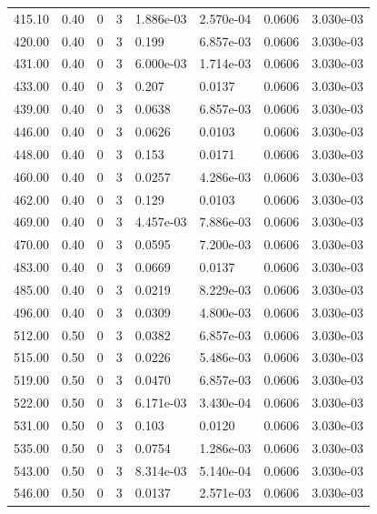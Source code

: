\documentclass[preview]{standalone}
\begin{document}
{{{{\begin{tabular}{L{1.2cm}C{1.2cm} C{0.3cm}C{0.5cm} C{1.4cm}C{1.4cm} C{1.4cm}C{1.4cm}}
  415.10  &  0.40  & 0     &  3 &  1.886e-03  & 2.570e-04  & 0.0606 &  3.030e-03   \\ 
  420.00  &  0.40  & 0     &  3 &  0.199  & 6.857e-03  & 0.0606 &  3.030e-03   \\ 
  431.00  &  0.40  & 0     &  3 &  6.000e-03  & 1.714e-03  & 0.0606 &  3.030e-03   \\ 
  433.00  &  0.40  & 0     &  3 &  0.207  & 0.0137  & 0.0606 &  3.030e-03   \\ 
  439.00  &  0.40  & 0     &  3 &  0.0638  & 6.857e-03  & 0.0606 &  3.030e-03   \\ 
  446.00  &  0.40  & 0     &  3 &  0.0626  & 0.0103  & 0.0606 &  3.030e-03   \\ 
  448.00  &  0.40  & 0     &  3 &  0.153  & 0.0171  & 0.0606 &  3.030e-03   \\ 
  460.00  &  0.40  & 0     &  3 &  0.0257  & 4.286e-03  & 0.0606 &  3.030e-03   \\ 
  462.00  &  0.40  & 0     &  3 &  0.129  & 0.0103  & 0.0606 &  3.030e-03   \\ 
  469.00  &  0.40  & 0     &  3 &  4.457e-03  & 7.886e-03  & 0.0606 &  3.030e-03   \\ 
  470.00  &  0.40  & 0     &  3 &  0.0595  & 7.200e-03  & 0.0606 &  3.030e-03   \\ 
  483.00  &  0.40  & 0     &  3 &  0.0669  & 0.0137  & 0.0606 &  3.030e-03   \\ 
  485.00  &  0.40  & 0     &  3 &  0.0219  & 8.229e-03  & 0.0606 &  3.030e-03   \\ 
  496.00  &  0.40  & 0     &  3 &  0.0309  & 4.800e-03  & 0.0606 &  3.030e-03   \\ 
  512.00  &  0.50  & 0     &  3 &  0.0382  & 6.857e-03  & 0.0606 &  3.030e-03   \\ 
  515.00  &  0.50  & 0     &  3 &  0.0226  & 5.486e-03  & 0.0606 &  3.030e-03   \\ 
  519.00  &  0.50  & 0     &  3 &  0.0470  & 6.857e-03  & 0.0606 &  3.030e-03   \\ 
  522.00  &  0.50  & 0     &  3 &  6.171e-03  & 3.430e-04  & 0.0606 &  3.030e-03   \\ 
  531.00  &  0.50  & 0     &  3 &  0.103  & 0.0120  & 0.0606 &  3.030e-03   \\ 
  535.00  &  0.50  & 0     &  3 &  0.0754  & 1.286e-03  & 0.0606 &  3.030e-03   \\ 
  543.00  &  0.50  & 0     &  3 &  8.314e-03  & 5.140e-04  & 0.0606 &  3.030e-03   \\ 
  546.00  &  0.50  & 0     &  3 &  0.0137  & 2.571e-03  & 0.0606 &  3.030e-03   \\ 

\end{tabular}}}}}
\end{document}

